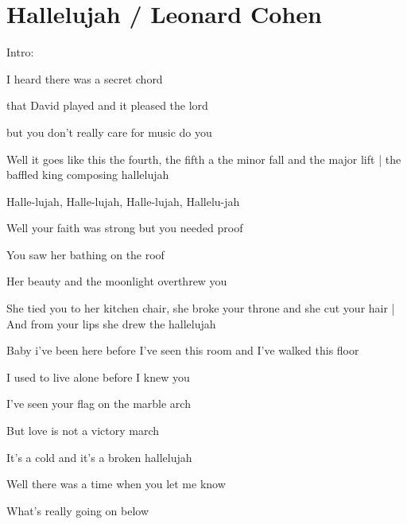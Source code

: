 \section{Hallelujah / Leonard Cohen}\label{sec:hallelujah}
\Cmajor
\Fmajor
\Gmajor
\Aminor
\Eseven

Intro:\hrulefill{}\hrulefill{}

I heard there was a secret chord

that David played and it pleased the lord

but you don't really care for music do you 

Well it goes like this the fourth, the fifth a the minor fall and the major lift | the baffled king composing hallelujah

Halle-lujah, Halle-lujah, Halle-lujah, Hallelu-jah \hrulefill{}\hrulefill{}\hrulefill{}\hrulefill

Well your faith was strong but you needed proof

You saw her bathing on the roof

Her beauty and the moonlight overthrew you 

She tied you to her kitchen chair, she broke your throne and she cut your hair | And from your lips she drew the hallelujah

Baby i've been here before I've seen this room and I've walked this floor

I used to live alone before I knew you 

I've seen your flag on the marble arch

But love is not a victory march

It's a cold and it's a broken hallelujah

Well there was a time when you let me know 

What's really going on below

